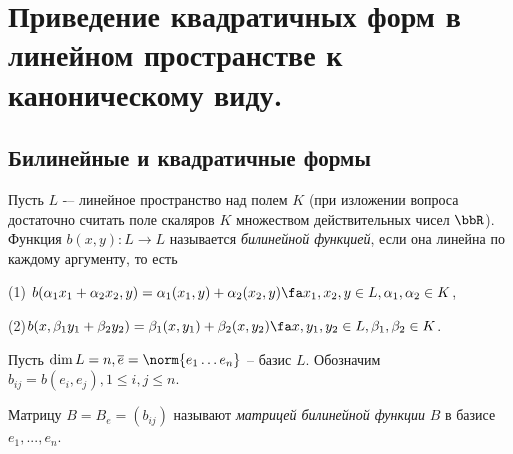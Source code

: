 \chapter{Приведение квадратичных форм в линейном пространстве к каноническому виду.}
\section{Билинейные и квадратичные формы}
  \begin{defn}  
  Пусть $L$ -– линейное пространство над полем $K$ (при изложении вопроса достаточно считать поле скаляров $K$ множеством действительных чисел $\bbR$). 
Функция $b(x,y): L\rightarrow L$ называется \textit{билинейной функцией}, если она линейна по каждому аргументу, то есть

(1) $b(\alpha_1 x_1+\alpha_2 x_2,y)=\alpha_1(x_1,y)+\alpha_2(x_2,y) \fa x_1,x_2,y \in L, \alpha_1,\alpha_2 \in K$,

(2)$b(x,\beta_1 y_1+\beta_2 y_2)=\beta_1(x,y_1)+\beta_2(x,y_2)  \fa x,y_1,y_2 \in L, \beta_1,\beta_2 \in K$.
  \end{defn}
  Пусть $\dim L=n, \overline{e}=\norm{e_1 \ldots e_n}$ -- базис $L$. Обозначим $b_{ij}=b(e_i,e_j), 1\le i,j \le n$.
  \begin{defn}
  Матрицу $B=B_e=(b_{ij})$ называют \textit{матрицей билинейной 	функции} $B$ в базисе $e_1,...,e_n$.
  \end{defn}
  
